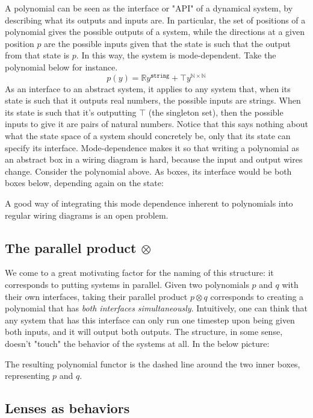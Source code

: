 A polynomial can be seen as the interface or "API" of a dynamical system, by describing what its outputs and inputs are. In particular, the set of positions of a polynomial gives the possible outputs of a system, while the directions at a given position $p$ are the possible inputs given that the state is such that the output from that state is $p$. In this way, the system is mode-dependent. Take the polynomial below for instance.
$$
p(y) = \mathbb{R}y^{\texttt{string}} + \top y^{\mathbb{N} \times \mathbb{N}}
$$
As an interface to an abstract system, it applies to any system that, when its state is such that it outputs real numbers, the possible inputs are strings. When its state is such that it's outputting $\top$ (the singleton set), then the possible inputs to give it are pairs of natural numbers. Notice that this says nothing about what the state space of a system should concretely be, only that its state can specify its interface. Mode-dependence makes it so that writing a polynomial as an abstract box in a wiring diagram is hard, because the input and output wires change. Consider the polynomial above. As boxes, its interface would be both boxes below, depending again on the state:


A good way of integrating this mode dependence inherent to polynomials into regular wiring diagrams is an open problem.

\subsection{The parallel product $\otimes$}
We come to a great motivating factor for the naming of this structure: it corresponds to putting systems in parallel. Given two polynomials $p$ and $q$ with their own interfaces, taking their parallel product $p \otimes q$ corresponds to creating a polynomial that has \textit{both interfaces simultaneously}. Intuitively, one can think that any system that has this interface can only run one timestep upon being given both inputs, and it will output both outputs. The structure, in some sense, doesn't "touch" the behavior of the systems at all. In the below picture:


The resulting polynomial functor is the dashed line around the two inner boxes, representing $p$ and $q$.

\subsection{Lenses as behaviors}

